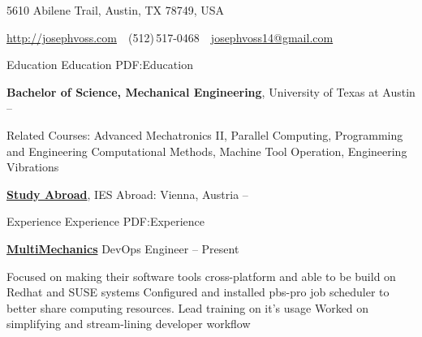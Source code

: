 \documentclass[letterpaper,MMMyyyy,nonstopmode]{simpleresumecv}
\newcommand{\CVAuthor}{Joseph Voss}
\newcommand{\CVWebpage}{http://josephvoss.com}
\begin{document}

\Title{\CVAuthor}

\begin{SubTitle}
{5610 Abilene Trail, Austin, TX 78749, USA}
\par
\href{\CVWebpage}
{\url{\CVWebpage}}
\,\SubBulletSymbol\,
(512)\,517-0468
\,\SubBulletSymbol\,
\href{mailto:josephvoss14@gmail.com}
{josephvoss14@gmail.com}

\end{SubTitle}

\begin{Body}


\Section
{Education}
{Education}
{PDF:Education}

\Entry
{\textbf{Bachelor of Science, Mechanical Engineering}},
University of Texas at Austin
\hfill
{} --

\Gap
\begin{Detail}
Related Courses:
Advanced Mechatronics II, Parallel Computing, Programming and Engineering
    Computational Methods, Machine Tool Operation, Engineering Vibrations
\end{Detail}

\BigGap
\Entry
\href{http://sites.utexas.edu/studyabroad/self-discovery-in-austria/}
{\textbf{Study Abroad}},
IES Abroad: Vienna, Austria
\hfill
{} -- 


\Section
{Experience}
{Experience}
{PDF:Experience}

\Entry
\href{http://multimechanics.com}
{\textbf{MultiMechanics}}
\Gap
\BulletItem
DevOps Engineer
\hfill
{} --
Present
\begin{Detail}
\SubBulletItem
Focused on making their software tools cross-platform and able to be build on
    Redhat \newline and SUSE systems
\SubBulletItem
Configured and installed pbs-pro job scheduler to better share computing
    resources. \newline Lead training on it's usage
\SubBulletItem
Worked on simplifying and stream-lining developer workflow
\end{Detail}


\end{Body}
\end{document}
